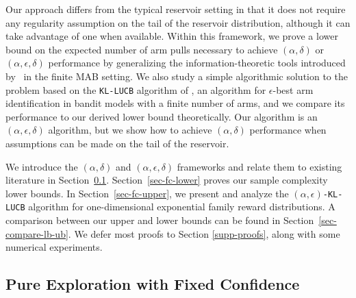 Our approach
differs from the typical reservoir setting in that it does not require any
regularity assumption on the tail of the reservoir distribution,
although it can take advantage of one when available.
Within this framework, we prove a lower bound on the expected number
of arm pulls necessary to achieve $(\alpha,\delta)$
or $(\alpha,\epsilon,\delta)$
performance by generalizing the information-theoretic tools introduced
by~\cite{JMLR15}
in the finite MAB setting.  We also study
a simple algorithmic solution to the problem based on 
the \texttt{KL-LUCB} algorithm of \cite{COLT13}, an
algorithm for $\epsilon$-best arm identification in bandit models with a finite
number of arms, and we compare its performance to our derived
lower bound theoretically.
Our algorithm is an $(\alpha, \epsilon, \delta)$ algorithm,
but we show how to achieve $(\alpha,\delta)$ performance
when assumptions can be made on the tail of the reservoir.

We introduce
the $(\alpha,\delta)$ and $(\alpha, \epsilon, \delta)$ frameworks and relate
them to existing literature in Section~\ref{sec-prelim}.
Section~\ref{sec-fc-lower} proves our sample complexity lower bounds.
In  Section~\ref{sec-fc-upper}, we present and analyze the \texttt{$(\alpha,\epsilon)$-KL-LUCB} algorithm for one-dimensional exponential family reward distributions.
A comparison between our upper and lower bounds can be found in Section~\ref{sec-compare-lb-ub}.
We defer most proofs to Section \ref{supp-proofs}, along with some
numerical experiments.



%
%
\subsection{Pure Exploration with Fixed Confidence}\label{sec-prelim}

